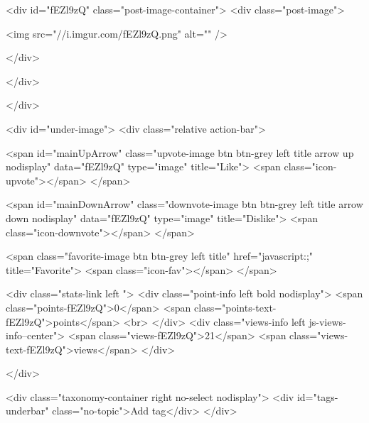                     

                    <div id="fEZl9zQ" class="post-image-container">
                        <div class="post-image">
    

                        <img src="//i.imgur.com/fEZl9zQ.png" alt="" />
        
    
</div>


                        
                    </div>
                

                

                
                </div>

                <div id="under-image">
                    <div class="relative action-bar">

    <span id="mainUpArrow" class="upvote-image btn btn-grey left title arrow up nodisplay" data="fEZl9zQ" type="image" title="Like">
        <span class="icon-upvote"></span>
    </span>

    <span id="mainDownArrow" class="downvote-image btn btn-grey left title arrow down nodisplay" data="fEZl9zQ" type="image" title="Dislike">
        <span class="icon-downvote"></span>
    </span>

    <span class="favorite-image btn btn-grey left title" href="javascript:;" title="Favorite">
        <span class="icon-fav"></span>
    </span>

    <div class="stats-link left ">
                    <div class="point-info left bold nodisplay">
                <span class="points-fEZl9zQ">0</span>
                <span class="points-text-fEZl9zQ">points</span>
                <br>
            </div>
            <div class="views-info left js-views-info--center">
                <span class="views-fEZl9zQ">21</span>
                <span class="views-text-fEZl9zQ">views</span>
            </div>
        

        
                    
        

    </div>

    <div class="taxonomy-container right no-select nodisplay">
        <div id="tags-underbar" class="no-topic">Add tag</div>
    </div>

